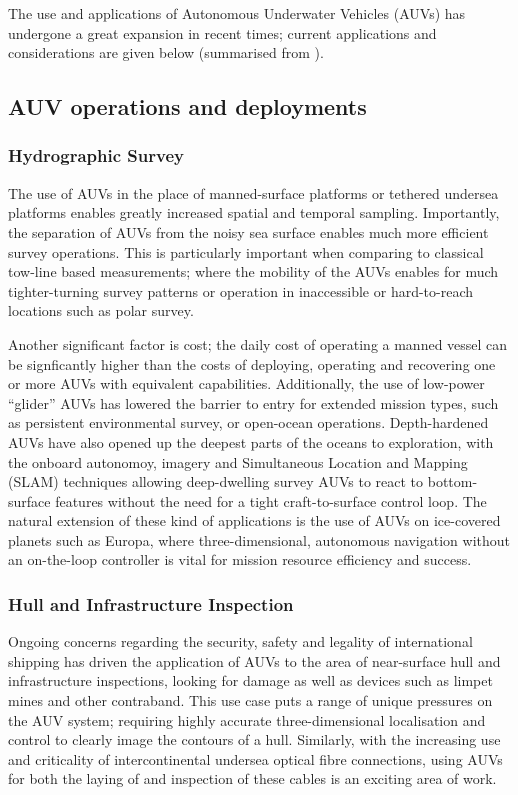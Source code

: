 \documentclass[conference]{IEEEtran}
\begin{document}
The use and applications of Autonomous Underwater Vehicles (AUVs) has undergone a great expansion in recent times; current applications and considerations are given below (summarised from \cite{Jalving2003}).


\subsection{AUV operations and deployments}

\subsubsection{Hydrographic Survey}

The use of AUVs in the place of manned-surface platforms or tethered undersea platforms enables greatly increased spatial and temporal sampling.
Importantly, the separation of AUVs from the noisy sea surface enables much more efficient survey operations.
This is particularly important when comparing to classical tow-line based measurements; where the mobility of the AUVs enables for much tighter-turning survey patterns or operation in inaccessible or hard-to-reach locations such as polar survey\cite{Curtin1993}.

Another significant factor is cost; the daily cost of operating a manned vessel can be signficantly higher than the costs of deploying, operating and recovering one or more AUVs with equivalent capabilities\cite{Nicholson2008}.
Additionally, the use of low-power ``glider'' AUVs has lowered the barrier to entry for extended mission types, such as persistent environmental survey, or open-ocean operations. 
Depth-hardened AUVs have also opened up the deepest parts of the oceans to exploration, with the onboard autonomoy, imagery and Simultaneous Location and Mapping (SLAM) techniques allowing deep-dwelling survey AUVs to react to bottom-surface features without the need for a tight craft-to-surface control loop.
The natural extension of these kind of applications is the use of AUVs on ice-covered planets such as Europa, where three-dimensional, autonomous navigation without an on-the-loop controller is vital for mission resource efficiency and success.

\subsubsection{Hull and Infrastructure Inspection}
Ongoing concerns regarding the security, safety and legality of international shipping has driven the application of AUVs to the area of near-surface hull and infrastructure inspections, looking for damage as well as devices such as limpet mines and other contraband.
This use case puts a range of unique pressures on the AUV system; requiring highly accurate three-dimensional localisation and control to clearly image the contours of a hull\cite{Nicholson2008}.
Similarly, with the increasing use and criticality of intercontinental undersea optical fibre connections, using AUVs for both the laying of and inspection of these cables is an exciting area of work\cite{Yu2004}\cite{Asakawa2002}.
\end{document}
